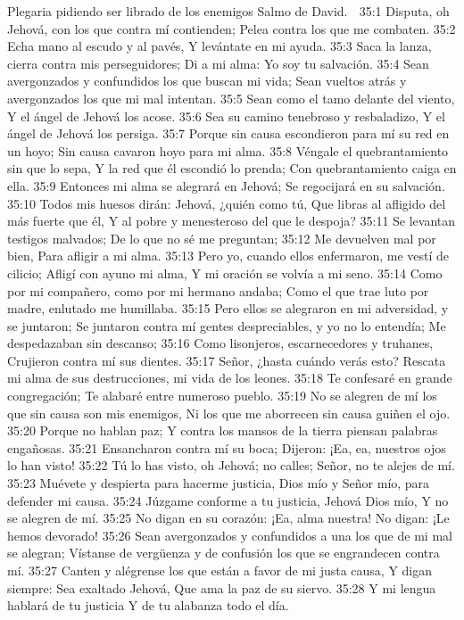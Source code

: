 Plegaria pidiendo ser librado de los enemigos 
Salmo de David. 

35:1 Disputa, oh Jehová, con los que contra mí contienden; 
Pelea contra los que me combaten. 
35:2 Echa mano al escudo y al pavés, 
Y levántate en mi ayuda. 
35:3 Saca la lanza, cierra contra mis perseguidores; 
Di a mi alma: Yo soy tu salvación. 
35:4 Sean avergonzados y confundidos los que buscan mi vida; 
Sean vueltos atrás y avergonzados los que mi mal intentan. 
35:5 Sean como el tamo delante del viento, 
Y el ángel de Jehová los acose. 
35:6 Sea su camino tenebroso y resbaladizo, 
Y el ángel de Jehová los persiga. 
35:7 Porque sin causa escondieron para mí su red en un hoyo; 
Sin causa cavaron hoyo para mi alma. 
35:8 Véngale el quebrantamiento sin que lo sepa, 
Y la red que él escondió lo prenda; 
Con quebrantamiento caiga en ella. 
35:9 Entonces mi alma se alegrará en Jehová; 
Se regocijará en su salvación. 
35:10 Todos mis huesos dirán: Jehová, ¿quién como tú, 
Que libras al afligido del más fuerte que él, 
Y al pobre y menesteroso del que le despoja? 
35:11 Se levantan testigos malvados; 
De lo que no sé me preguntan; 
35:12 Me devuelven mal por bien, 
Para afligir a mi alma. 
35:13 Pero yo, cuando ellos enfermaron, me vestí de cilicio; 
Afligí con ayuno mi alma, 
Y mi oración se volvía a mi seno. 
35:14 Como por mi compañero, como por mi hermano andaba; 
Como el que trae luto por madre, enlutado me humillaba. 
35:15 Pero ellos se alegraron en mi adversidad, y se juntaron; 
Se juntaron contra mí gentes despreciables, y yo no lo entendía; 
Me despedazaban sin descanso; 
35:16 Como lisonjeros, escarnecedores y truhanes, 
Crujieron contra mí sus dientes. 
35:17 Señor, ¿hasta cuándo verás esto? 
Rescata mi alma de sus destrucciones, mi vida de los leones. 
35:18 Te confesaré en grande congregación; 
Te alabaré entre numeroso pueblo. 
35:19 No se alegren de mí los que sin causa son mis enemigos, 
Ni los que me aborrecen sin causa guiñen el ojo. 
35:20 Porque no hablan paz; 
Y contra los mansos de la tierra piensan palabras engañosas. 
35:21 Ensancharon contra mí su boca; 
Dijeron: ¡Ea, ea, nuestros ojos lo han visto! 
35:22 Tú lo has visto, oh Jehová; no calles; 
Señor, no te alejes de mí. 
35:23 Muévete y despierta para hacerme justicia, 
Dios mío y Señor mío, para defender mi causa. 
35:24 Júzgame conforme a tu justicia, Jehová Dios mío, 
Y no se alegren de mí. 
35:25 No digan en su corazón: ¡Ea, alma nuestra! 
No digan: ¡Le hemos devorado! 
35:26 Sean avergonzados y confundidos a una los que de mi mal se alegran; 
Vístanse de vergüenza y de confusión los que se engrandecen contra mí. 
35:27 Canten y alégrense los que están a favor de mi justa causa, 
Y digan siempre: Sea exaltado Jehová, 
Que ama la paz de su siervo. 
35:28 Y mi lengua hablará de tu justicia 
Y de tu alabanza todo el día. 

